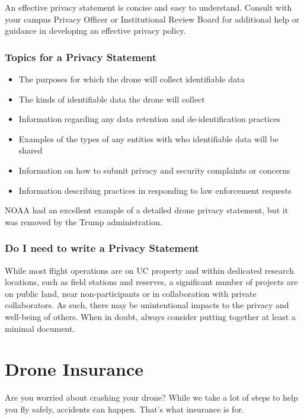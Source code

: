 \documentclass[
  12pt,
]{book}
\providecommand{\tightlist}{%
  \setlength{\itemsep}{0pt}\setlength{\parskip}{0pt}}
\begin{document}
An effective privacy statement is concise and easy to understand. Consult with your campus Privacy Officer or Institutional Review Board for additional help or guidance in developing an effective privacy policy.

\subsection{Topics for a Privacy Statement}\label{topics-for-a-privacy-statement}

\begin{itemize}
\tightlist
\item
  The purposes for which the drone will collect identifiable data
\item
  The kinds of identifiable data the drone will collect
\item
  Information regarding any data retention and de-identification practices
\item
  Examples of the types of any entities with who identifiable data will be shared
\item
  Information on how to submit privacy and security complaints or concerns
\item
  Information describing practices in responding to law enforcement requests
\end{itemize}

NOAA had an excellent example of a detailed drone privacy statement, but it was removed by the Trump administration.

\subsection{Do I need to write a Privacy Statement}\label{do-i-need-to-write-a-privacy-statement}

While most flight operations are on UC property and within dedicated research locations, such as field stations and reserves, a significant number of projects are on public land, near non-participants or in collaboration with private collaborators. As such, there may be unintentional impacts to the privacy and well-being of others. When in doubt, always consider putting together at least a minimal document.

\chapter{Drone Insurance}\label{insurance}

Are you worried about crashing your drone? While we take a lot of steps to help you fly safely, accidents can happen. That's what insurance is for.
\end{document}
